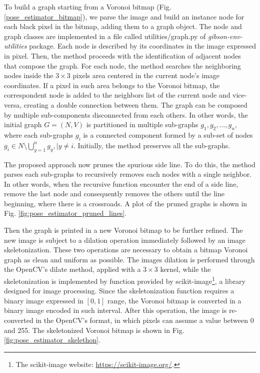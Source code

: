 To build a graph starting from a Voronoi bitmap (Fig. \ref{pose_estimator_bitmap}), we parse the image and build an instance node for each black pixel in the bitmap, adding them to a graph object. The \textsf{node} and \textsf{graph} classes are implemented in a file called \textsf{utilities/graph.py} of \textit{gibson-env-utilities} package. Each node is described by its coordinates in the image expressed in pixel. Then, the method proceeds with the identification of adjacent nodes that compose the graph. For each node, the method searches the neighboring nodes inside the $3 \times 3$ pixels area centered in the current node's image coordinates. If a pixel in such area belongs to the Voronoi bitmap, the correspondent node is added to the neighbors list of the current node and vice-versa, creating a double connection between them. The graph can be composed by multiple sub-components disconnected from each others. In other words, the initial graph $G = (N, V)$ is partitioned in multiple sub-graphs $g_1, g_2, ..., g_n$, where each sub-graphs $g_i$ is a connected component formed by a sub-set of nodes $g_i \in N \setminus \bigcup_{y=1}^{n} g_{y}, \mid y  \neq i$. Initially, the method preserves all the sub-graphs. 

The proposed approach now prunes the spurious side line. To do this, the method parses each sub-graphs to recursively removes each nodes with a single neighbor. In other words, when the recursive function encounter the end of a side line, remove the last node and consequently removes the others until the line beginning, where there is a crossroads. A plot of the pruned graphs is shown in Fig. \ref{fig:pose_estimator_pruned_lines}. 

Then the graph is printed in a new Voronoi bitmap to be further refined. The new image is subject to a dilation operation immediately followed by an image skeletonization. These two operations are necessary to obtain a bitmap Voronoi graph as clean and uniform as possible. The images dilation is performed through the OpenCV's \textsf{dilate} method, applied with a $3 \times 3$ kernel, while the skeletonization is implemented by function provided by scikit-image\footnote{The scikit-image website: \url{https://scikit-image.org/}.}, a library designed for image processing.
Since the skeletonization function requires a binary image expressed in $[0, 1]$ range, the Voronoi bitmap is converted in a binary image encoded in such interval. After this operation, the image is re-converted in the OpenCV's format, in which pixels can assume a value between 0 and 255. The skeletonized Voronoi bitmap is shown in Fig. \ref{fig:pose_estimator_skelethon}. 

